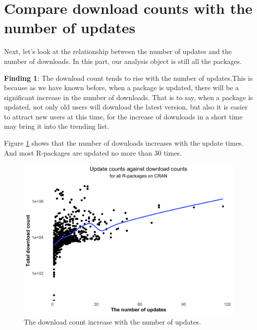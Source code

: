 \documentclass[
]{book}
\newenvironment{discovery}[1]{%
  \begin{tcolorbox}[colback=blue!30,colframe=blue!80!black]#1}{\end{tcolorbox}}
\begin{document}
\hypertarget{compare-download-counts-with-the-number-of-updates}{%
\section{Compare download counts with the number of updates}\label{compare-download-counts-with-the-number-of-updates}}

Next, let's look at the relationship between the number of updates and the number of downloads.
In this part, our analysis object is still all the packages.

\begin{discovery}
\textbf{Finding 1}: The download count tends to rise with the number of
updates.This is because as we have known before, when a package is
updated, there will be a significant increase in the number of
downloads. That is to say, when a package is updated, not only old users
will download the latest version, but also it is easier to attract new
users at this time, for the increase of downloads in a short time may
bring it into the trending list.
\end{discovery}

Figure \ref{fig:all-updates} shows that the number of downloads increases with the update times. And most R-packages are updated no more than 30 times.



\begin{figure}

{\centering \includegraphics{figures/all-updates-1} 

}

\caption{The download count increase with the number of updates.}\label{fig:all-updates}
\end{figure}
\end{document}

